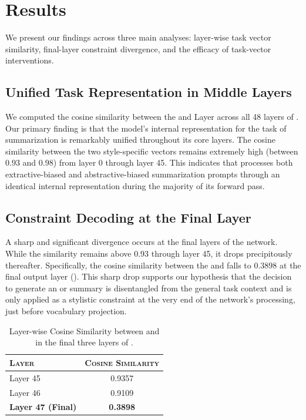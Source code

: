 \section{Results}
\label{sec:results}

We present our findings across three main analyses: layer-wise task vector similarity, final-layer constraint divergence, and the efficacy of task-vector interventions.

\subsection{Unified Task Representation in Middle Layers}
We computed the cosine similarity between the \cnndm and \xsum Layer \fvsabbr across all 48 layers of \gpttwo. Our primary finding is that the model's internal representation for the task of summarization is remarkably unified throughout its core layers. The cosine similarity between the two style-specific vectors remains extremely high (between $0.93$ and $0.98$) from layer 0 through layer 45. This indicates that \gpttwo processes both extractive-biased and abstractive-biased summarization prompts through an identical internal representation during the majority of its forward pass.

\subsection{Constraint Decoding at the Final Layer}
A sharp and significant divergence occurs at the final layers of the network. While the similarity remains above $0.93$ through layer 45, it drops precipitously thereafter. Specifically, the cosine similarity between the \cnndm and \xsum \fvsabbr falls to $0.3898$ at the final output layer (). This sharp drop supports our hypothesis that the decision to generate an \extractive or \abstractive summary is disentangled from the general task context and is only applied as a stylistic constraint at the very end of the network's processing, just before vocabulary projection.

\begin{table}[h]
\centering
\caption{Layer-wise Cosine Similarity between \cnndm and \xsum \fvsabbr in the final three layers of \gpttwo.}
\label{tab:layer_similarity}
\begin{tabular}{lc}
\toprule
\textsc{Layer} & \textsc{Cosine Similarity} \\
\midrule
Layer 45 & 0.9357 \\
Layer 46 & 0.9109 \\
{\bf Layer 47 (Final)} & {\bf 0.3898} \\
\bottomrule
\end{tabular}
\end{table}

